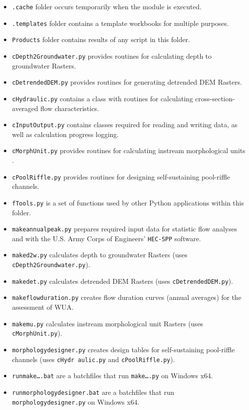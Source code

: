 \begin{itemize}
\begin{itemize}
		\item \texttt{.cache} folder occurs temporarily when the module is executed.
		\item \texttt{.templates} folder contains a template workbooks for multiple purposes.
		\item \texttt{Products} folder contains results of any script in this folder.
		\item \texttt{cDepth2Groundwater.py} provides routines for calculating depth to groundwater Rasters.
		\item \texttt{cDetrendedDEM.py} provides routines for generating detrended DEM Rasters.
		\item \texttt{cHydraulic.py} contains a  class with routines for calculating cross-section-averaged flow characteristics.
		\item \texttt{cInputOutput.py} contains classes required for reading and writing data, as well as calculation progress logging.
		\item \texttt{cMorphUnit.py} provides routines for calculating instream morphological units \citep{wyrick14b}.
		\item \texttt{cPoolRiffle.py} provides routines for designing self-sustaining pool-riffle channels.
		\item \texttt{fTools.py} is a set of functions used by other Python applications within this folder.		
		\item \texttt{make{\myUnderscore}annual{\myUnderscore}peak.py} prepares required input data for statistic flow analyses and with the U.S. Army Corps of Engineers' \texttt{HEC-SPP} software.
		\item \texttt{make{\myUnderscore}d2w.py} calculates depth to groundwater Rasters (uses \texttt{cDepth2Groundwater.py}).
		\item \texttt{make{\myUnderscore}det.py} calculates detrended DEM Rasters (uses \texttt{cDetrendedDEM.py}).
		\item \texttt{make{\myUnderscore}flow{\myUnderscore}duration.py} creates flow duration curves (annual averages) for the assessment of WUA.
		\item \texttt{make{\myUnderscore}mu.py} calculates instream morphological unit Rasters (uses \texttt{cMorphUnit.py}).
		\item \texttt{morphology{\myUnderscore}designer.py} creates design tables for self-sustaining pool-riffle channels (uses \texttt{cHydr aulic.py} and \texttt{cPoolRiffle.py}).
		\item \texttt{run{\myUnderscore}make{\myUnderscore}\ldots{}.bat} are a batchfiles that run \texttt{make{\myUnderscore}\ldots{}.py} on Windows x64.
		\item \texttt{run{\myUnderscore}morphology{\myUnderscore}designer.bat} are a batchfiles that run \texttt{morphology{\myUnderscore}designer.py} on Windows x64.
	\end{itemize}
\end{itemize}

